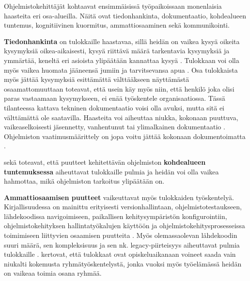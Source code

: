 \documentclass[utf8]{gradu3}
\begin{document}
Ohjelmistokehittäjät kohtaavat ensimmäisissä työpaikoissaan monenlaisia haasteita eri osa-alueilla. Näitä ovat tiedonhankinta, dokumentaatio, kohdealueen tuntemus, kognitiivinen kuormitus, ammattiosaaminen sekä kommunikointi. 

\textbf{Tiedonhankinta} on tulokkaille haastavaa, sillä heidän on vaikea kysyä oikeita kysymyksiä oikea-aikaisesti, kysyä riittävä määrä tarkentavia kysymyksiä ja ymmärtää, keneltä eri asioista ylipäätään kannattaa kysyä %
\parencites%
    {ju-ym-2021}%
    {britto-ym-2019}%
    {craig-ym-2018}%
    {matturro-ym-2017}%
    {dagenais-ym-2010}%
    {begel-simon-2008}%
\relax
%
. Tulokkaan voi olla myös vaikea huomata jääneensä jumiin ja tarvitsevansa apua \parencite{begel-simon-2008}. Osa tulokkaista myös jättää  kysymyksiä esittämättä välttääkseen näyttämästä osaamattomuuttaan 
\parencites%
    {radermacher-ym-2015}%
    {begel-simon-2008}%
\relax
 \textcite{dagenais-ym-2010} toteavat, että usein käy myös niin, että henkilö joka olisi paras vastaamaan kysymykseen, ei enää työskentele organisaatiossa. Tässä tilanteessa kattava tekninen dokumentaatio voisi olla avuksi, mutta sitä ei välttämättä ole saatavilla. Haasteita voi aiheuttaa niukka, kokonaan puuttuva, vaikeaselkoisesti jäsennetty, vanhentunut tai ylimalkainen dokumentaatio %
\parencites%
    {matturro-ym-2017}%
    {dagenais-ym-2010}%
    {begel-simon-2008}%
\relax
. Ohjelmiston vaatimusmäärittely on jopa voitu jättää kokonaan dokumentoimatta \parencite{matturro-ym-2017}.

\textcite{matturro-ym-2017} sekä \textcite{dagenais-ym-2010} toteavat, että puutteet kehitettävän ohjelmiston \textbf{kohdealueen tuntemuksessa} aiheuttavat tulokkaille pulmia ja heidän voi olla vaikea hahmottaa, mikä ohjelmiston tarkoitus ylipäätään on.

\textbf{Ammattiosaamisen puutteet} vaikeuttavat myös tulokkaiden työskentelyä. Kirjallisuudessa
on mainittu erityisesti versionhallintaan, ohjelmistotestaukseen, lähdekoodissa navigoimiseen, paikallisen kehitysympäristön konfigurointiin, ohjelmistokehityksen hallintatyökalujen käyttöön ja ohjelmistokehitysprosesseissa toimimiseen liittyvien osaamisen puutteita  %
\parencites%
    {craig-ym-2018}%
    {matturro-ym-2017}%
    {dagenais-ym-2010}%
    {begel-simon-2008}%
\relax
% 
. Myös olemassaolevan lähdekoodin suuri määrä, sen kompleksisuus ja sen nk. legacy-piirteisyys aiheuttavat pulmia tulokkaille %
\parencites%
    {britto-ym-2019}%
    {viviani-murphy-2019}%
    {craig-ym-2018}
    {begel-simon-2008}%
\relax.
\textcite{craig-ym-2018} kertovat, että tulokkaat ovat opiskeluaikanaan voineet saada vain niukalti kokemusta ryhmätyöskentelystä, jonka vuoksi myös työelämässä heidän on vaikeaa toimia osana ryhmää.
\end{document}

